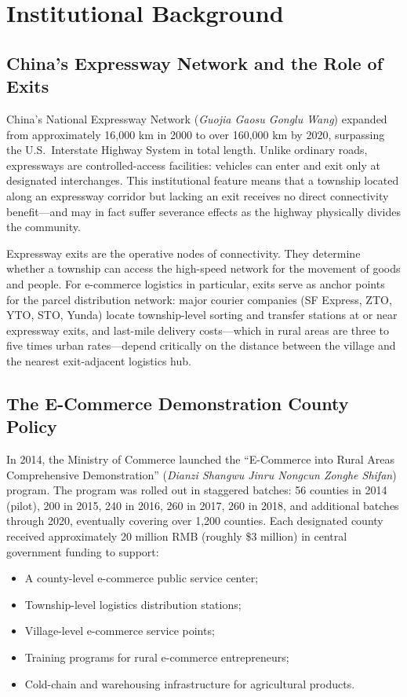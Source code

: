 \documentclass[12pt]{article}
\begin{document}
\section{Institutional Background}\label{sec:background}

\subsection{China's Expressway Network and the Role of Exits}

China's National Expressway Network (\textit{Guojia Gaosu Gonglu Wang}) expanded from approximately 16,000 km in 2000 to over 160,000 km by 2020, surpassing the U.S.\ Interstate Highway System in total length. Unlike ordinary roads, expressways are controlled-access facilities: vehicles can enter and exit only at designated interchanges. This institutional feature means that a township located along an expressway corridor but lacking an exit receives no direct connectivity benefit---and may in fact suffer severance effects as the highway physically divides the community.

Expressway exits are the operative nodes of connectivity. They determine whether a township can access the high-speed network for the movement of goods and people. For e-commerce logistics in particular, exits serve as anchor points for the parcel distribution network: major courier companies (SF Express, ZTO, YTO, STO, Yunda) locate township-level sorting and transfer stations at or near expressway exits, and last-mile delivery costs---which in rural areas are three to five times urban rates---depend critically on the distance between the village and the nearest exit-adjacent logistics hub.

\subsection{The E-Commerce Demonstration County Policy}

In 2014, the Ministry of Commerce launched the ``E-Commerce into Rural Areas Comprehensive Demonstration'' (\textit{Dianzi Shangwu Jinru Nongcun Zonghe Shifan}) program. The program was rolled out in staggered batches: 56 counties in 2014 (pilot), 200 in 2015, 240 in 2016, 260 in 2017, 260 in 2018, and additional batches through 2020, eventually covering over 1,200 counties. Each designated county received approximately 20 million RMB (roughly \$3 million) in central government funding to support:

\begin{itemize}[nosep]
    \item A county-level e-commerce public service center;
    \item Township-level logistics distribution stations;
    \item Village-level e-commerce service points;
    \item Training programs for rural e-commerce entrepreneurs;
    \item Cold-chain and warehousing infrastructure for agricultural products.
\end{itemize}
\end{document}
